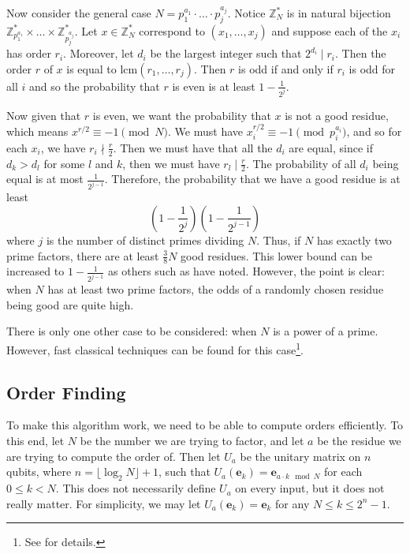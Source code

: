 \documentclass[a4paper]{article}
\newcommand\0{\mathbf{0}}
\newcommand\ee{\mathbf{e}}
\newcommand\ZZ{\mathbb{Z}}
\newcommand\<{\langle}
\renewcommand\>{\rangle}
\begin{document}
Now consider the general case $N=p_1^{a_1}\cdot\dots\cdot p_j^{a_j}$. Notice $\ZZ_N^*$ is in natural bijection $\ZZ_{p_1^{a_1}}^*\times\dots\times \ZZ_{p_j^{a_j}}^*$. Let $x\in \ZZ_N^*$ correspond to $(x_1,\ldots,x_j)$ and suppose each of the $x_i$ has order $r_i$. Moreover, let $d_i$ be the largest integer such that $2^{d_i} \mid r_i$. Then the order $r$ of $x$ is equal to $\text{lcm}(r_1,\ldots,r_j)$. Then $r$ is odd if and only if $r_i$ is odd for all $i$ and so the probability that $r$ is even is at least $1-\frac{1}{2^j}$. 

Now given that $r$ is even, we want the probability that $x$ is not a good residue, which means $x^{r/2}\equiv -1\pmod{N}$. We must have $x_i^{r/2} \equiv -1 \pmod{p_i^{a_i}}$, and so for each $x_i$, we have $r_i\nmid \frac{r}{2}$. Then we must have that all the $d_i$ are equal, since if $d_k>d_l$ for some $l$ and $k$, then we must have $r_l\mid\frac{r}{2}$. The probability of all $d_i$ being equal is at most $\frac{1}{2^{j-1}}$. Therefore, the probability that we have a good residue is at least $$\left(1-\frac{1}{2^j}\right)\left(1-\frac{1}{2^{j-1}}\right) $$
where $j$ is the number of distinct primes dividing $N$. Thus, if $N$ has exactly two prime factors, there are at least $\frac{3}{8}N$ good residues. This lower bound can be increased to $1-\frac{1}{2^{j-1}}$ as others such as \cite{watrous06} have noted. However, the point is clear: when $N$ has at least two prime factors,  the odds of a randomly chosen residue being good are quite high.

There is only one other case to be considered: when $N$ is a power of a prime. However, fast classical techniques can be found for this case\footnote{See \cite{bacon06} for details.}.

\subsection{Order Finding}

To make this algorithm work, we need to be able to compute orders efficiently. To this end, let $N$ be the number we are trying to factor, and let $a$ be the residue we are trying to compute the order of. Then let $U_a$ be the unitary matrix on $n$ qubits, where $n=\lfloor \log_2 N\rfloor +1$, such that $U_a(\ee_k) = \ee_{a\cdot k\mod{N}}$ for each $0\le k < N$.  This does not necessarily define $U_a$ on every input, but it does not really matter. For simplicity, we may let $U_a(\ee_k) = \ee_k$ for any $N\le k\le 2^{n}-1$.
\end{document}
